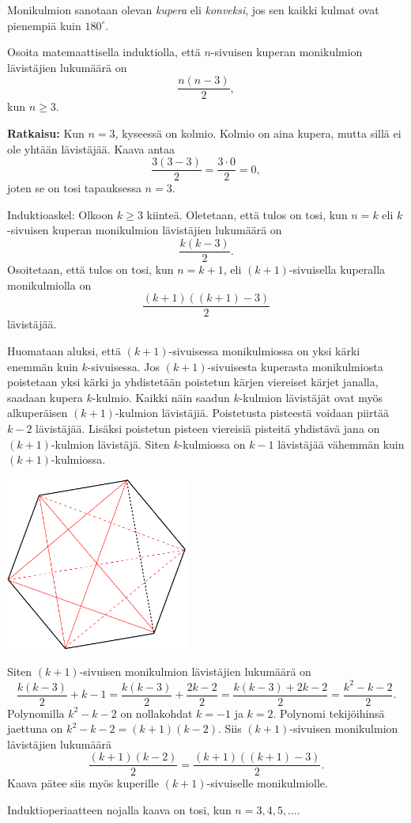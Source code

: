 \begin{esimerkki}
Monikulmion sanotaan olevan {\em kupera} eli {\em konveksi}, jos sen kaikki kulmat ovat pienempiä kuin $180^\circ$.

Osoita matemaattisella induktiolla, että $n$-sivuisen kuperan monikulmion lävistäjien
lukumäärä on
\[
\frac{n(n-3)}{2},
\]
kun $n\ge 3$.

{\bf Ratkaisu:}
Kun $n = 3$, kyseessä on kolmio. Kolmio on aina kupera, mutta sillä ei ole yhtään lävistäjää. Kaava antaa
\[
\frac{3(3-3)}{2}=\frac{3\cdot 0}{2} =0,
\]
joten se on tosi tapauksessa $n=3$.

Induktioaskel: Olkoon $k\ge 3$ kiinteä. Oletetaan, että tulos on tosi, kun $n=k$ eli $k$-sivuisen kuperan monikulmion lävistäjien lukumäärä on
\[
\frac{k(k-3)}{2}.
\]
Osoitetaan, että tulos on tosi, kun $n=k+1$, eli $(k+1)$-sivuisella kuperalla monikulmiolla on
\[
\frac{(k+1)((k+1)-3)}{2}
\]
lävistäjää.

Huomataan aluksi, että $(k+1)$-sivuisessa monikulmiossa on yksi kärki enemmän kuin $k$-sivuisessa. Jos $(k+1)$-sivuisesta kuperasta monikulmiosta poistetaan yksi kärki ja yhdistetään poistetun kärjen viereiset kärjet janalla, saadaan kupera $k$-kulmio. Kaikki näin saadun $k$-kulmion lävistäjät ovat myös alkuperäisen $(k+1)$-kulmion lävistäjiä.
Poistetusta pisteestä voidaan piirtää $k - 2$ lävistäjää. Lisäksi poistetun pisteen viereisiä pisteitä yhdistävä jana on $(k+1)$-kulmion lävistäjä. Siten $k$-kulmiossa on $k-1$ lävistäjää vähemmän kuin $(k+1)$-kulmiossa.

\begin{center}
\includegraphics[width=6cm]{pictures/kulmiot}
\end{center}


Siten $(k + 1)$-sivuisen monikulmion lävistäjien lukumäärä on
\[
\frac{k (k - 3)}{2} +k-1=
\frac{k (k - 3)}{2} + \frac{2k - 2}{2}
=
\frac{k (k - 3)+2k-2}{2}=\frac{k^2-k-2}{2}.
\]
Polynomilla $k^2 - k - 2$ on nollakohdat $k = -1$ ja $k = 2$. Polynomi tekijöihinsä jaettuna
on $k^2 -k -2 = (k + 1)(k- 2)$. Siis $(k + 1)$-sivuisen monikulmion lävistäjien lukumäärä
\[
\frac{(k + 1)(k - 2)}{2}= \frac{(k + 1)((k + 1)-3)}{2}.
\]
Kaava pätee siis myös kuperille $(k + 1)$-sivuiselle monikulmiolle.

Induktioperiaatteen nojalla kaava on tosi, kun $n=3,4,5,\ldots$.
\end{esimerkki}


